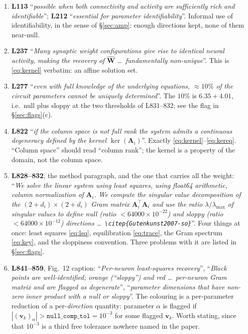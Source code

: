 \documentclass[11pt]{article}
\newcommand{\Mat}[1]{\mathbf{#1}}
\newcommand{\A}{\Mat{A}}
\begin{document}
\begin{enumerate}
\item \textbf{L113} ``\emph{possible when both connectivity and activity are
sufficiently rich and identifiable}''; \textbf{L212} ``\emph{essential for
parameter identifiability}''. Informal use of identifiability, in the sense of
§\ref{sec:amp}: enough directions kept, none of them near-null.

\item \textbf{L237} ``\emph{Many synaptic weight configurations give rise to
identical neural activity, making the recovery of $\hat{\Mat W}$ \dots\
fundamentally non-unique}''. This is \eqref{eq:kernel} verbatim: an affine
solution set.

\item \textbf{L277} ``\emph{even with full knowledge of the underlying
equations, $\approx 10\%$ of the circuit parameters cannot be uniquely
determined}''. The $10\%$ is $6.35 + 4.01$, i.e.\ null plus sloppy at the two
thresholds of L831--832; see the flag in §\ref{sec:flags}(c).

\item \textbf{L822} ``\emph{if the column space is not full rank the system
admits a continuous degeneracy defined by the kernel $\ker(\A_i)$}''. Exactly
\eqref{eq:kernel}--\eqref{eq:kereq}. ``Column space'' should read ``column
rank''; the kernel is a property of the domain, not the column space.

\item \textbf{L828--832}, the method paragraph, and the one that carries all the
weight: ``\emph{We solve the linear system using least squares, using float64
arithmetic, column normalization of $\A_i$. We compute the singular value
decomposition of the $(2+d_i)\times(2+d_i)$ Gram matrix $\A_i^{\!\top}\A_i$ and
use the ratio $\lambda/\lambda_{\max}$ of singular values to define null (ratio
$< 64000\times10^{-22}$) and sloppy (ratio $< 64000\times10^{-12}$) directions
\dots\ \texttt{\textbackslash citep\{Gutenkunst2007-so\}}}''. Four things at once: least squares
\eqref{eq:lsq}, equilibration \eqref{eq:trace}, the Gram spectrum
\eqref{eq:key}, and the sloppiness convention. Three problems with it are listed
in §\ref{sec:flags}.

\item \textbf{L841--859}, Fig.~12 caption: ``\emph{Per-neuron least-squares
recovery}'', ``\emph{Black points are well-identified; orange (``sloppy'') and
red \dots\ per-neuron Gram matrix and are flagged as degenerate}'',
``\emph{parameter dimensions that have non-zero inner product with a null or
sloppy}''. The colouring is a per-parameter reduction of a per-\emph{direction}
quantity: parameter $\alpha$ is flagged if $|(\Mat v_k)_\alpha| >
\texttt{null\_comp\_tol}=10^{-3}$ for some flagged $\Mat v_k$. Worth stating,
since that $10^{-3}$ is a third free tolerance nowhere named in the paper.


\end{enumerate}
\end{document}
